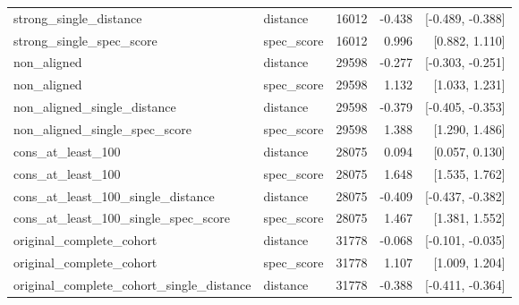 \begin{longtable}{p{3.7cm}p{2.1cm}rrr}
strong\_\allowbreak{}single\_\allowbreak{}distance & distance & 16012 & -0.438 & [-0.489, -0.388]\\

strong\_\allowbreak{}single\_\allowbreak{}spec\_\allowbreak{}score & spec\_\allowbreak{}score & 16012 & 0.996 & [0.882, 1.110]\\

non\_\allowbreak{}aligned & distance & 29598 & -0.277 & [-0.303, -0.251]\\

non\_\allowbreak{}aligned & spec\_\allowbreak{}score & 29598 & 1.132 & [1.033, 1.231]\\

non\_\allowbreak{}aligned\_\allowbreak{}single\_\allowbreak{}distance & distance & 29598 & -0.379 & [-0.405, -0.353]\\

non\_\allowbreak{}aligned\_\allowbreak{}single\_\allowbreak{}spec\_\allowbreak{}score & spec\_\allowbreak{}score & 29598 & 1.388 & [1.290, 1.486]\\

cons\_\allowbreak{}at\_\allowbreak{}least\_\allowbreak{}100 & distance & 28075 & 0.094 & [0.057, 0.130]\\

cons\_\allowbreak{}at\_\allowbreak{}least\_\allowbreak{}100 & spec\_\allowbreak{}score & 28075 & 1.648 & [1.535, 1.762]\\

cons\_\allowbreak{}at\_\allowbreak{}least\_\allowbreak{}100\_\allowbreak{}single\_\allowbreak{}distance & distance & 28075 & -0.409 & [-0.437, -0.382]\\

cons\_\allowbreak{}at\_\allowbreak{}least\_\allowbreak{}100\_\allowbreak{}single\_\allowbreak{}spec\_\allowbreak{}score & spec\_\allowbreak{}score & 28075 & 1.467 & [1.381, 1.552]\\

original\_\allowbreak{}complete\_\allowbreak{}cohort & distance & 31778 & -0.068 & [-0.101, -0.035]\\

original\_\allowbreak{}complete\_\allowbreak{}cohort & spec\_\allowbreak{}score & 31778 & 1.107 & [1.009, 1.204]\\

original\_\allowbreak{}complete\_\allowbreak{}cohort\_\allowbreak{}single\_\allowbreak{}distance & distance & 31778 & -0.388 & [-0.411, -0.364]\\


\end{longtable}
